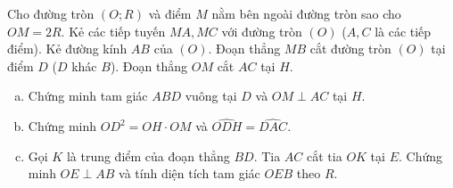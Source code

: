 \begin{bt}%
Cho đường tròn $(O; R)$ và điểm $M$ nằm bên ngoài đường tròn sao cho $OM = 2R$. Kẻ các tiếp tuyến $MA, MC$ với đường tròn $(O)$ ($A, C$ là các tiếp điểm). Kẻ đường kính $AB$ của $(O)$. Đoạn thẳng $MB$ cắt đường tròn $(O)$ tại điểm $D$ ($D$ khác $B$). Đoạn thẳng $OM$ cắt $AC$ tại $H$.
\begin{enumerate}[a)]
	\item Chứng minh tam giác $ABD$ vuông tại $D$ và $OM \perp AC$ tại $H$.
	\item Chứng minh $OD^2 = OH \cdot OM$ và $\widehat{ODH} = \widehat{DAC}$.
	\item Gọi $K$ là trung điểm của đoạn thẳng $BD$. Tia $AC$ cắt tia $OK$ tại $E$. Chứng minh $OE \perp AB$ và tính diện tích tam giác $OEB$ theo $R$.
\end{enumerate}
\end{bt}

